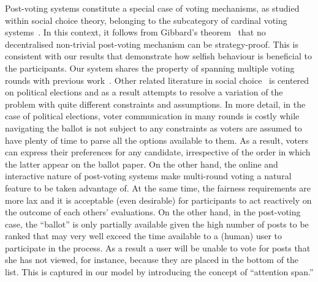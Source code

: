 Post-voting systems constitute a special case of voting mechanisms, as studied within social choice theory, belonging to the subcategory of cardinal voting systems~\cite{hillinger2005case}. In this context, it follows from Gibbard's theorem~\cite{gibbard1973manipulation} that no decentralised non-trivial
post-voting mechanism can be strategy-proof. This is consistent with our results that
demonstrate how selfish behaviour is beneficial to the participants. Our system shares the property of spanning multiple voting rounds with previous work~\cite{kalech2011practical}. Other related literature in social choice~\cite{lu2011robust,conitzer2005communication,xia2010compilation} is centered on political elections and as a result attempts to resolve a variation of the problem with quite different constraints and assumptions. In more detail, in the case of political elections, voter communication in many rounds is costly while navigating the ballot is not subject to any constraints as voters are assumed to have plenty of time to parse all the options available to them. As a result, voters can express their preferences for any candidate, irrespective of the order in which the latter appear on the ballot paper. On the other hand, the online and interactive nature of post-voting systems make multi-round voting a natural feature to be taken advantage of. At the same time, the fairness requirements are more lax and it is acceptable (even desirable) for participants to act reactively on the outcome of each others' evaluations. On the other hand, in the post-voting case, the ``ballot'' is only partially available given the high number of posts to be ranked that may very well exceed the time available to a (human) user to participate in the process. As a result a user will be unable to vote for posts that she has not viewed, for instance, because they are placed in the bottom of the list. This is captured in our model by introducing the concept of ``attention span.''

